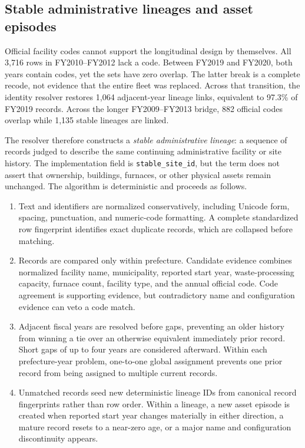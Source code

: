 \documentclass[12pt,letterpaper]{article}
\begin{document}
\subsection{Stable administrative lineages and asset episodes}

Official facility codes cannot support the longitudinal design by themselves.
All 3,716 rows in FY2010--FY2012 lack a code. Between FY2019 and FY2020, both
years contain codes, yet the sets have zero overlap. The latter break is a
complete recode, not evidence that the entire fleet was replaced. Across that
transition, the identity resolver restores 1,064 adjacent-year lineage links,
equivalent to 97.3\% of FY2019 records. Across the longer FY2009--FY2013 bridge,
882 official codes overlap while 1,135 stable lineages are linked.

The resolver therefore constructs a \emph{stable administrative lineage}: a
sequence of records judged to describe the same continuing administrative
facility or site history. The implementation field is
\texttt{stable\_site\_id}, but the term does not assert that ownership,
buildings, furnaces, or other physical assets remain unchanged. The algorithm
is deterministic and proceeds as follows.

\begin{enumerate}
\item Text and identifiers are normalized conservatively, including Unicode
form, spacing, punctuation, and numeric-code formatting. A complete standardized
row fingerprint identifies exact duplicate records, which are collapsed before
matching.
\item Records are compared only within prefecture. Candidate evidence combines
normalized facility name, municipality, reported start year, waste-processing
capacity, furnace count, facility type, and the annual official code. Code
agreement is supporting evidence, but contradictory name and configuration
evidence can veto a code match.
\item Adjacent fiscal years are resolved before gaps, preventing an older
history from winning a tie over an otherwise equivalent immediately prior
record. Short gaps of up to four years are considered afterward. Within each
prefecture-year problem, one-to-one global assignment prevents one prior record
from being assigned to multiple current records.
\item Unmatched records seed new deterministic lineage IDs from canonical record
fingerprints rather than row order. Within a lineage, a new asset episode is
created when reported start year changes materially in either direction, a
mature record resets to a near-zero age, or a major name and configuration
discontinuity appears.
\end{enumerate}
\end{document}
